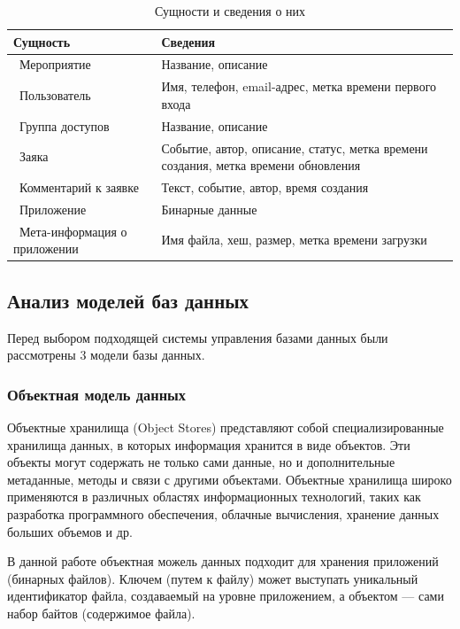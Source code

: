 \begin{table}[ht!]
	\centering
	\caption{Сущности и сведения о них}
	\label{decisions}
	\begin{tabular}{|p{4.3cm}|p{10.3cm}|}
		\hline
		\textbf{Сущность} & \textbf{Сведения}\\
		\hline 
		\ Мероприятие & Название, описание \\
		\hline 
		\ Пользователь &  Имя, телефон, email-адрес, метка времени первого входа \\
		\hline 
		\ Группа доступов & Название, описание \\
		\hline 
		\ Заяка & Событие, автор, описание, статус, метка времени создания, метка времени обновления\\
		\hline 
		\ Комментарий к заявке & Текст, событие, автор, время создания \\
		\hline 
		\ Приложение & Бинарные данные \\
		\hline 
		\ Мета-информация о приложении & Имя файла, хеш, размер, метка времени загрузки \\
		\hline
	\end{tabular}
\end{table}

\subsection{Анализ моделей баз данных}

Перед выбором подходящей системы управления базами данных были рассмотрены 3 модели базы данных.

\subsubsection{Объектная модель данных}

Объектные хранилища (Object Stores) представляют собой специализированные хранилища данных, в которых информация хранится в виде объектов. Эти объекты могут содержать не только сами данные, но и дополнительные метаданные, методы и связи с другими объектами. Объектные хранилища широко применяются в различных областях информационных технологий, таких как разработка программного обеспечения, облачные вычисления, хранение данных больших объемов и др.


В данной работе объектная можель данных подходит для хранения приложений (бинарных файлов).  Ключем (путем к файлу) может выступать уникальный идентификатор файла, создаваемый на уровне приложением, а объектом --- сами набор байтов (содержимое файла).

